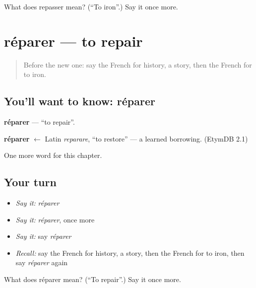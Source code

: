 \begin{tcolorbox}[breakable,colback=teal!4,colframe=teal!35!black,title={Before you move on}]
What does repasser mean? (\textquotedblleft{}To iron\textquotedblright{}.) Say it once more.
\end{tcolorbox}
\section[réparer]{réparer — to repair}

\label{lesson:FR-C233-reparer}



\begin{quote}
Before the new one: say the French for history, a story, then the French for to iron.
\end{quote}

\subsection*{You'll want to know: réparer}
\textbf{réparer} — \textquotedblleft{}to repair\textquotedblright{}.

\begin{cousinweb}
\textbf{réparer} $\leftarrow$ Latin \emph{reparare}, \textquotedblleft{}to restore\textquotedblright{} — a learned borrowing. (EtymDB 2.1)
\end{cousinweb}

\begin{grammarlens}[title={What you've built}]
One more word for this chapter.
\end{grammarlens}

\subsection*{Your turn}
\begin{itemize}
\raggedright
  \item \emph{Say it:} \emph{réparer}
  \item \emph{Say it:} \emph{réparer}, once more
  \item \emph{Say it:} say \emph{réparer}
  \item \emph{Recall:} say the French for history, a story, then the French for to iron, then say \emph{réparer} again
\end{itemize}

\begin{tcolorbox}[breakable,colback=teal!4,colframe=teal!35!black,title={Before you move on}]
What does réparer mean? (\textquotedblleft{}To repair\textquotedblright{}.) Say it once more.
\end{tcolorbox}
